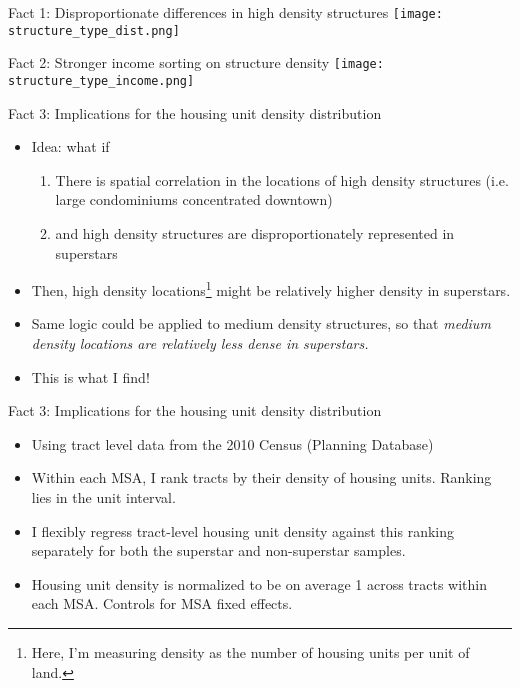 \documentclass{beamer}
\theoremstyle{plain}
\begin{document}
\begin{frame}{Fact 1: Disproportionate differences in high density structures}
 \texttt{[image: structure\_type\_dist.png]}
\end{frame}

\begin{frame}{Fact 2: Stronger income sorting on structure density}
\texttt{[image: structure\_type\_income.png]}
\end{frame}

\begin{frame}{Fact 3: Implications for the housing unit density distribution}
\begin{itemize}
	\color{black}
	\item Idea: what if
	\begin{enumerate}
		\item There is spatial correlation in the locations of high density structures (i.e. large condominiums concentrated downtown) \pause
		\item and high density structures are disproportionately represented in superstars
	\end{enumerate}
\item Then, high density locations\footnote{Here, I'm measuring density as the number of housing units per unit of land.} might be relatively higher density in superstars. 
\item Same logic could be applied to \color{red} medium \color{black} density structures, so that \textit{\color{red} medium \color{black} density locations are relatively less dense in superstars.}
\item This is what I find!
\end{itemize}
\end{frame}

\begin{frame}{Fact 3: Implications for the housing unit density distribution}
\begin{itemize}
	\color{black}
	\item Using tract level data from the 2010 Census (Planning Database) \pause
	\item Within each MSA, I rank tracts by their density of housing units. Ranking lies in the unit interval. \pause
	\item I flexibly regress tract-level housing unit density against this ranking separately for both the superstar and non-superstar samples. \pause
	\item Housing unit density is \color{red} normalized to be on average 1 \color{black} across tracts within each MSA. Controls for MSA fixed effects. 
\end{itemize}
\end{frame}
\end{document}
